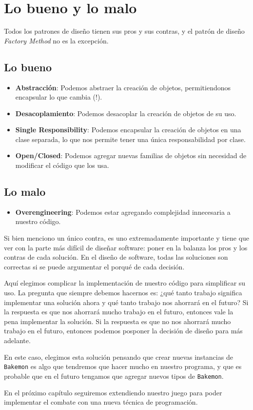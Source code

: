 \section{Lo bueno y lo malo}
  Todos los patrones de diseño tienen sus pros y sus contras, y el patrón de diseño \textit{Factory
  Method} no es la excepción.

  \subsection{Lo bueno}
    \begin{itemize}
      \item \textbf{Abstracción}: Podemos abstraer la creación de objetos, permitiendonos encapsular
        lo que cambia (!).
      \item \textbf{Desacoplamiento}: Podemos desacoplar la creación de objetos de su uso.
      \item \textbf{Single Responsibility}: Podemos encapsular la creación de objetos en una clase
        separada, lo que nos permite tener una única responsabilidad por clase.
      \item \textbf{Open/Closed}: Podemos agregar nuevas familias de objetos sin necesidad de
        modificar el código que los usa.
    \end{itemize}
  
  \subsection{Lo malo}
    \begin{itemize}
      \item \textbf{Overengineering}: Podemos estar agregando complejidad innecesaria a nuestro
        código.
    \end{itemize}

    Si bien menciono un único contra, es uno extremadamente importante y tiene que ver con la
    parte más difícil de diseñar software: poner en la balanza los pros y los contras de cada
    solución.
    En el diseño de software, todas las soluciones son correctas si se puede argumentar el porqué
    de cada decisión.

    Aquí elegimos complicar la implementación de nuestro código para simplificar su uso.
    La pregunta que siempre debemos hacernos es: ¿qué tanto trabajo significa implementar una 
    solución ahora y qué tanto trabajo nos ahorrará en el futuro?
    Si la respuesta es que nos ahorrará mucho trabajo en el futuro, entonces vale la pena
    implementar la solución.
    Si la respuesta es que no nos ahorrará mucho trabajo en el futuro, entonces podemos posponer
    la decisión de diseño para más adelante.

    En este caso, elegimos esta solución pensando que crear nuevas instancias de \texttt{Bakemon}
    es algo que tendremos que hacer mucho en nuestro programa, y que es probable que en el futuro
    tengamos que agregar nuevos tipos de \texttt{Bakemon}.

    En el próximo capítulo seguiremos extendiendo nuestro juego para poder implementar el combate
    con una nueva técnica de programación.